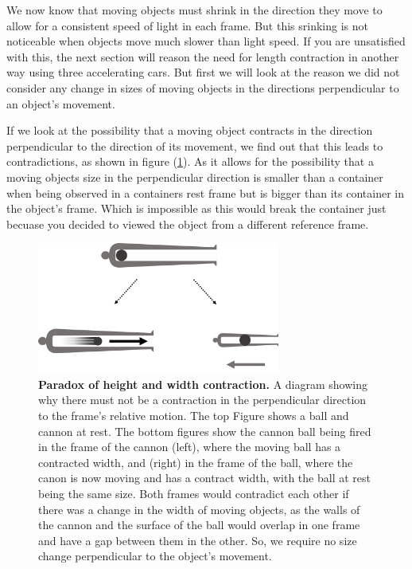 We now know that moving objects must shrink in the direction they move to allow for a consistent speed of light in each frame.
But this srinking is not noticeable when objects move much slower than light speed.
If you are unsatisfied with this, the next section will reason the need for length contraction in another way using three accelerating cars.
But first we will look at the reason we did not consider any change in sizes of moving objects in the directions perpendicular to an object's movement.

If we look at the possibility that a moving object contracts in the direction perpendicular to the direction of its movement, we find out that this leads to contradictions, as shown in figure (\ref{fig: width contraction}).
As it allows for the possibility that a moving objects size in the perpendicular direction is smaller than a container when being observed in a containers rest frame but is bigger than its container in the object's frame.
Which is impossible as this would break the container just becuase you decided to viewed the object from a different reference frame.

\begin{figure}[H]
	\centering
	\includegraphics[width = 8cm]{images/pdf/Cannon_Balls.pdf}
	\caption{\textbf{Paradox of height and width contraction.} A diagram showing why there must not be a contraction in the perpendicular direction to the frame's relative motion. The top Figure shows a ball and cannon at rest. The bottom figures show the cannon ball being fired in the frame of the cannon (left), where the moving ball has a contracted width, and (right) in the frame of the ball, where the canon is now moving and has a contract width, with the ball at rest being the same size. Both frames would contradict each other if there was a change in the width of moving objects, as the walls of the cannon and the surface of the ball would overlap in one frame and have a gap between them in the other. So, we require no size change perpendicular to the object's movement.}
	\label{fig: width contraction}
\end{figure}

